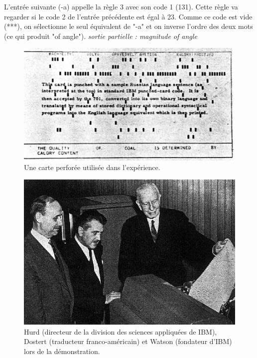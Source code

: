 \documentclass[11pt, a4paper]{report}
\begin{document}
L'entrée suivante (-a) appelle la règle 3 avec son code 1 (131). Cette règle va regarder si le 
code 2 de l'entrée précédente est égal à 23. Comme ce code est vide (***), on sélectionne le seul 
équivalent de "-a" et on inverse l'ordre des deux mots (ce qui produit "of angle"). \newline
\textit{sortie partielle : magnitude of angle}

\begin{figure}[t]
  \centering
  \includegraphics[width=1\textwidth]{punched-card.png}
  \caption{Une carte perforée utilisée dans l'expérience.}
  \label{fig:carte-perforee}
\end{figure}

\begin{figure}[t]
  \centering
  \includegraphics[width=1\textwidth]{georgetown-chercheurs.png}
  \caption{Hurd (directeur de la division des sciences appliquées de IBM), Dostert (traducteur franco-américain) et Watson (fondateur d'IBM) lors de la démonstration.}
  \label{fig:carte-perforee}
\end{figure}
\end{document}

